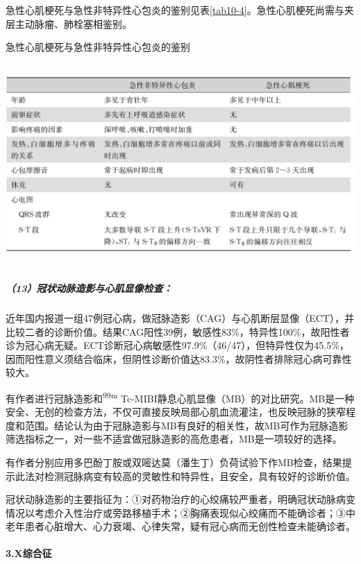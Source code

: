 急性心肌梗死与急性非特异性心包炎的鉴别见表\ref{tab10-4}。急性心肌梗死尚需与夹层主动脉瘤、肺栓塞相鉴别。

\begin{table}[htbp]
\centering
\caption{急性心肌梗死与急性非特异性心包炎的鉴别}
\label{tab10-4}
\includegraphics[width=5.91667in,height=3.02083in]{./images/Image00078.jpg}
\end{table}

\subparagraph{（13）冠状动脉造影与心肌显像检查：}

近年国内报道一组47例冠心病，做冠脉造影（CAG）与心肌断层显像（ECT），并比较二者的诊断价值。结果CAG阳性39例，敏感性83\%，特异性100\%，故阳性者诊为冠心病无疑。ECT诊断冠心病敏感性97.9\%（46/47），但特异性仅为45.5\%，因而阳性意义须结合临床，但阴性诊断价值达83.3\%，故阴性者排除冠心病可靠性较大。

有作者进行冠脉造影和\textsuperscript{99m}
Tc-MIBI静息心肌显像（MB）的对比研究。MB是一种安全、无创的检查方法，不仅可直接反映局部心肌血流灌注，也反映冠脉的狭窄程度和范围。结论认为由于冠脉造影与MB有良好的相关性，故MB可作为冠脉造影筛选指标之一，对一些不适宜做冠脉造影的高危患者，MB是一项较好的选择。

有作者分别应用多巴酚丁胺或双嘧达莫（潘生丁）负荷试验下作MB检查，结果提示此法对检测冠脉病变有较高的灵敏性和特异性，且安全，具有较好的诊断价值。

冠状动脉造影的主要指征为：①对药物治疗的心绞痛较严重者，明确冠状动脉病变情况以考虑介入性治疗或旁路移植手术；②胸痛表现似心绞痛而不能确诊者；③中老年患者心脏增大、心力衰竭、心律失常，疑有冠心病而无创性检查未能确诊者。

\paragraph{3.X综合征}

